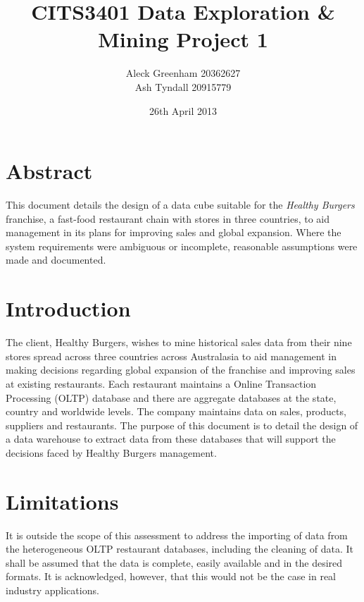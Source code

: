 \documentclass[12pt, a4paper]{article}
\newcommand{\subtitle}[1]{%
  \posttitle{%
    \par\end{center}
    \begin{center}\large#1\end{center}
    \vskip0.5em}%
}
\begin{document}
\title{CITS3401 Data Exploration \& Mining Project 1}
\subtitle{Healthy Burgers Fast Food Chain}
\author{Aleck Greenham 20362627 \\ Ash Tyndall 20915779}
\date{26th April 2013}

\maketitle

\section*{Abstract}

This document details the design of a data cube suitable for the \textit{Healthy Burgers} franchise, a fast-food restaurant chain with stores in three countries, to aid management in its plans for improving sales and global expansion. Where the system requirements \cite{designdoc} were ambiguous or incomplete, reasonable assumptions were made and documented.

\section*{Introduction}

The client, Healthy Burgers, wishes to mine historical sales data from their nine stores spread across three countries across Australasia to aid management in making decisions regarding global expansion of the franchise and improving sales at existing restaurants. Each restaurant maintains a Online Transaction Processing (OLTP) database and there are aggregate databases at the state, country and worldwide levels. The company maintains data on sales, products, suppliers and restaurants. The purpose of this document is to detail the design of a data warehouse to extract data from these databases that will support the decisions faced by Healthy Burgers management.

\section*{Limitations}

It is outside the scope of this assessment to address the importing of data from the heterogeneous OLTP restaurant databases, including the cleaning of data. It shall be assumed that the data is complete, easily available and in the desired formats. It is acknowledged, however, that this would not be the case in real industry applications.
\end{document}
